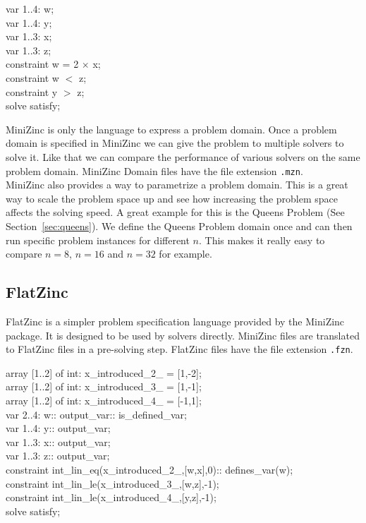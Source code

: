 \begin{tcolorbox}[title=MiniZinc example]
	var 1..4: w; \\
	var 1..4: y; \\
	var 1..3: x; \\
	var 1..3: z; \\

	constraint w = 2 $\times$ x; \\
	constraint w $<$ z; \\
	constraint y $>$ z; \\

	solve satisfy;
\end{tcolorbox}

MiniZinc is only the language to express a problem domain. Once a problem domain is specified in MiniZinc we can give the problem to multiple solvers to solve it. Like that we can compare the performance of various solvers on the same problem domain. MiniZinc Domain files have the file extension \verb|.mzn|. \\

MiniZinc also provides a way to parametrize a problem domain. This is a great way to scale the problem space up and see how increasing the problem space affects the solving speed. A great example for this is the Queens Problem (See Section~\ref{sec:queens}). We define the Queens Problem domain once and can then run specific problem instances for different $n$. This makes it really easy to compare $n = 8$, $n = 16$ and $n = 32$ for example.

\subsection{FlatZinc}

FlatZinc is a simpler problem specification language provided by the MiniZinc package. It is designed to be used by solvers directly. MiniZinc files are translated to FlatZinc files in a pre-solving step. FlatZinc files have the file extension \verb|.fzn|.

\begin{tcolorbox}[title=FlatZinc example]
	array [1..2] of int: x\_introduced\_2\_ = [1,-2]; \\
	array [1..2] of int: x\_introduced\_3\_ = [1,-1]; \\
	array [1..2] of int: x\_introduced\_4\_ = [-1,1]; \\
	var 2..4: w:: output\_var:: is\_defined\_var; \\
	var 1..4: y:: output\_var; \\
	var 1..3: x:: output\_var; \\
	var 1..3: z:: output\_var; \\
	constraint int\_lin\_eq(x\_introduced\_2\_,[w,x],0):: defines\_var(w); \\
	constraint int\_lin\_le(x\_introduced\_3\_,[w,z],-1); \\
	constraint int\_lin\_le(x\_introduced\_4\_,[y,z],-1); \\
	solve  satisfy;
\end{tcolorbox}

